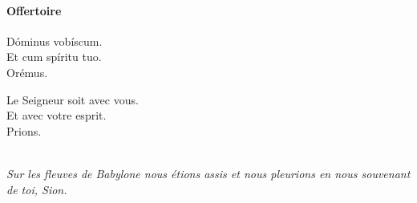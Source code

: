 \documentclass[twoside]{article}
\begin{document}
\paragraph{Offertoire}

\begin{paracol}{2}
\vv Dóminus vobíscum.\\
\rr Et cum spíritu tuo.\\
\vv Orémus.

\switchcolumn

\vv Le Seigneur soit avec vous.\\
\rr Et avec votre esprit.\\
\vv Prions.
\end{paracol}


\\
\emph{Sur les fleuves de Babylone nous étions assis et nous pleurions en nous souvenant de toi, Sion.}
\end{document}
